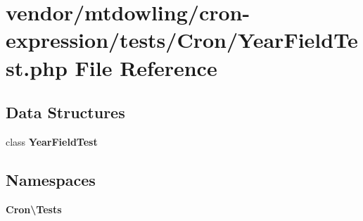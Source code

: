 \section{vendor/mtdowling/cron-\/expression/tests/\+Cron/\+Year\+Field\+Test.php File Reference}
\label{_year_field_test_8php}
\subsection*{Data Structures}
\begin{DoxyCompactItemize}
\item 
class {\bf Year\+Field\+Test}
\end{DoxyCompactItemize}
\subsection*{Namespaces}
\begin{DoxyCompactItemize}
\item 
 {\bf Cron\textbackslash{}\+Tests}
\end{DoxyCompactItemize}

